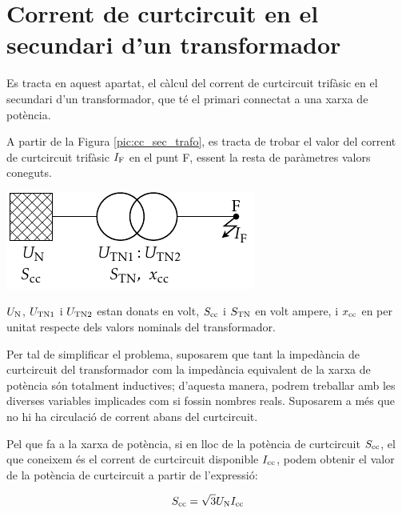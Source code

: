 \section{Corrent de curtcircuit en el  secundari d'un transformador}

 Es tracta en aquest apartat, el c\`{a}lcul del corrent de curtcircuit trif\`{a}sic en el secundari d'un transformador, que t\'{e} el
primari connectat  a una xarxa de pot\`{e}ncia.

A partir de la Figura \vref{pic:cc_sec_trafo}, es tracta de trobar
el valor del corrent de curtcircuit trif\`{a}sic $I_\mathrm{F}$ en el punt
F, essent la resta de par\`{a}metres valors coneguts.

\begin{center}
    \includegraphics{Imatges/Cap-CalcBas-Icc-Trafo.pdf}
     \label{pic:cc_sec_trafo}
\end{center}

$U_\mathrm{N}$, $U_\mathrm{TN1}$ i $U_\mathrm{TN2}$ estan donats en volt,
$S_\mathrm{cc}$ i $S_\mathrm{TN}$ en volt ampere, i $x_\mathrm{cc}$ en per unitat
respecte dels valors nominals del transformador.


Per tal de simplificar el problema, suposarem que tant la imped\`{a}ncia
de curtcircuit del transformador com la imped\`{a}ncia equivalent de
la xarxa de pot\`{e}ncia s\'{o}n totalment inductives; d'aquesta manera,
podrem treballar amb les diverses variables implicades com si
fossin nombres reals. Suposarem a m\'{e}s que no hi ha circulaci\'{o} de
corrent abans del curtcircuit.

Pel que fa a la xarxa de pot\`{e}ncia, si en lloc de la pot\`{e}ncia de curtcircuit $S_\mathrm{cc}$, el que coneixem \'{e}s el corrent de curtcircuit
disponible $I_\mathrm{cc}$, podem obtenir el valor de la pot\`{e}ncia de
curtcircuit a partir de l'expressi\'{o}:

\begin{equation}
    S_\mathrm{cc} = \sqrt{3} U_\mathrm{N} I_\mathrm{cc}
\end{equation}

